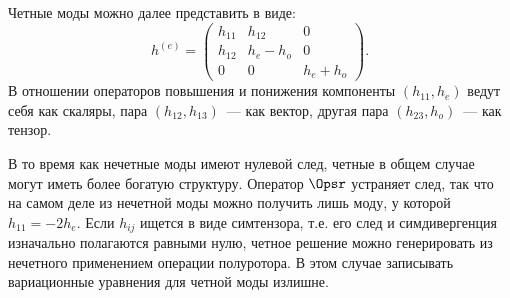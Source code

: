 \documentclass[\docroot/reports/draft/report.tex]{subfiles}
\begin{document}
    Четные моды можно далее представить в виде:
    \begin{equation}
        h^{(e)} = \begin{pmatrix}h_{11}&h_{12}&0\\h_{12}&h_e-h_o&0\\0&0&h_e+h_o\end{pmatrix} .
    \end{equation}
    В отношении операторов повышения и понижения компоненты $(h_{11},h_e)$ ведут себя как скаляры, пара $(h_{12},h_{13})$~--- как вектор, другая пара $(h_{23},h_o)$~--- как тензор.

    В то время как нечетные моды имеют нулевой след, четные в общем случае могут иметь более богатую структуру. Оператор $\Opsr$ устраняет след, так что на самом деле из нечетной моды можно получить лишь моду, у которой $h_{11} = -2 h_e$. Если $h_{ij}$ ищется в виде симтензора, т.е. его след и симдивергенция изначально полагаются равными нулю, четное решение можно генерировать из нечетного применением операции полуротора. В этом случае записывать вариационные уравнения для четной моды излишне.
\end{document}
